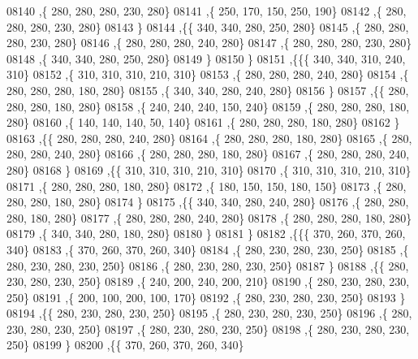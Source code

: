 \begin{DoxyCode}
08140     ,\{   280,   280,   280,   230,   280\}
08141     ,\{   250,   170,   150,   250,   190\}
08142     ,\{   280,   280,   280,   230,   280\}
08143     \}
08144    ,\{\{   340,   340,   280,   250,   280\}
08145     ,\{   280,   280,   280,   230,   280\}
08146     ,\{   280,   280,   280,   240,   280\}
08147     ,\{   280,   280,   280,   230,   280\}
08148     ,\{   340,   340,   280,   250,   280\}
08149     \}
08150    \}
08151   ,\{\{\{   340,   340,   310,   240,   310\}
08152     ,\{   310,   310,   310,   210,   310\}
08153     ,\{   280,   280,   280,   240,   280\}
08154     ,\{   280,   280,   280,   180,   280\}
08155     ,\{   340,   340,   280,   240,   280\}
08156     \}
08157    ,\{\{   280,   280,   280,   180,   280\}
08158     ,\{   240,   240,   240,   150,   240\}
08159     ,\{   280,   280,   280,   180,   280\}
08160     ,\{   140,   140,   140,    50,   140\}
08161     ,\{   280,   280,   280,   180,   280\}
08162     \}
08163    ,\{\{   280,   280,   280,   240,   280\}
08164     ,\{   280,   280,   280,   180,   280\}
08165     ,\{   280,   280,   280,   240,   280\}
08166     ,\{   280,   280,   280,   180,   280\}
08167     ,\{   280,   280,   280,   240,   280\}
08168     \}
08169    ,\{\{   310,   310,   310,   210,   310\}
08170     ,\{   310,   310,   310,   210,   310\}
08171     ,\{   280,   280,   280,   180,   280\}
08172     ,\{   180,   150,   150,   180,   150\}
08173     ,\{   280,   280,   280,   180,   280\}
08174     \}
08175    ,\{\{   340,   340,   280,   240,   280\}
08176     ,\{   280,   280,   280,   180,   280\}
08177     ,\{   280,   280,   280,   240,   280\}
08178     ,\{   280,   280,   280,   180,   280\}
08179     ,\{   340,   340,   280,   180,   280\}
08180     \}
08181    \}
08182   ,\{\{\{   370,   260,   370,   260,   340\}
08183     ,\{   370,   260,   370,   260,   340\}
08184     ,\{   280,   230,   280,   230,   250\}
08185     ,\{   280,   230,   280,   230,   250\}
08186     ,\{   280,   230,   280,   230,   250\}
08187     \}
08188    ,\{\{   280,   230,   280,   230,   250\}
08189     ,\{   240,   200,   240,   200,   210\}
08190     ,\{   280,   230,   280,   230,   250\}
08191     ,\{   200,   100,   200,   100,   170\}
08192     ,\{   280,   230,   280,   230,   250\}
08193     \}
08194    ,\{\{   280,   230,   280,   230,   250\}
08195     ,\{   280,   230,   280,   230,   250\}
08196     ,\{   280,   230,   280,   230,   250\}
08197     ,\{   280,   230,   280,   230,   250\}
08198     ,\{   280,   230,   280,   230,   250\}
08199     \}
08200    ,\{\{   370,   260,   370,   260,   340\}

\end{DoxyCode}
